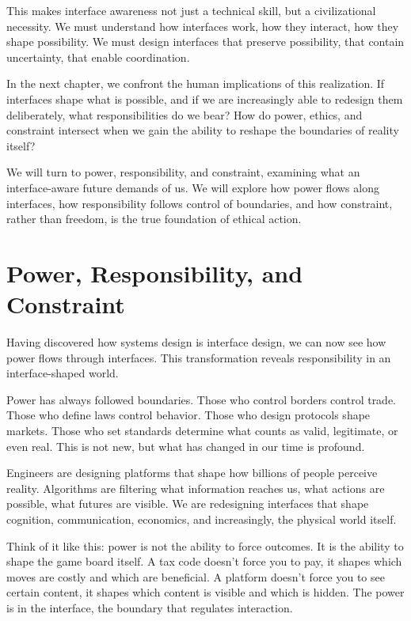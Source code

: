 \documentclass[
  openright]{book}
\begin{document}
This makes interface awareness not just a technical skill, but a
civilizational necessity. We must understand how interfaces work, how
they interact, how they shape possibility. We must design interfaces
that preserve possibility, that contain uncertainty, that enable
coordination.

In the next chapter, we confront the human implications of this
realization. If interfaces shape what is possible, and if we are
increasingly able to redesign them deliberately, what responsibilities
do we bear? How do power, ethics, and constraint intersect when we gain
the ability to reshape the boundaries of reality itself?

We will turn to power, responsibility, and constraint, examining what an
interface-aware future demands of us. We will explore how power flows
along interfaces, how responsibility follows control of boundaries, and
how constraint, rather than freedom, is the true foundation of ethical
action.

\chapter{\texorpdfstring{Power,
Responsibility, and
Constraint}{Power, Responsibility, and Constraint}}\label{power-responsibility-and-constraint}

Having discovered how systems design is interface design, we can now see
how power flows through interfaces. This transformation reveals
responsibility in an interface-shaped world.

Power has always followed boundaries. Those who control borders control
trade. Those who define laws control behavior. Those who design
protocols shape markets. Those who set standards determine what counts
as valid, legitimate, or even real. This is not new, but what has
changed in our time is profound.

Engineers are designing platforms that shape how billions of people
perceive reality. Algorithms are filtering what information reaches us,
what actions are possible, what futures are visible. We are redesigning
interfaces that shape cognition, communication, economics, and
increasingly, the physical world itself.

Think of it like this: power is not the ability to force outcomes. It is
the ability to shape the game board itself. A tax code doesn't force you
to pay, it shapes which moves are costly and which are beneficial. A
platform doesn't force you to see certain content, it shapes which
content is visible and which is hidden. The power is in the interface,
the boundary that regulates interaction.
\end{document}
